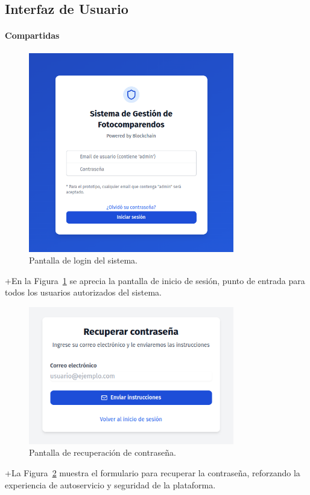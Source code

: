\subsection{Interfaz de Usuario}
\paragraph{Compartidas}
 \begin{figure}[htbp]
    \centering
    \includegraphics[width=0.8\textwidth]{Images/UI1.png}
    \caption{Pantalla de login del sistema.}
    \label{fig:login}
\end{figure}
+En la Figura~\ref{fig:login} se aprecia la pantalla de inicio de sesión, punto de entrada para todos los usuarios autorizados del sistema.

 \begin{figure}[htbp]
    \centering
    \includegraphics[width=0.8\textwidth]{Images/UI2.png}
    \caption{Pantalla de recuperación de contraseña.}
    \label{fig:recuperar_password}
\end{figure}
+La Figura~\ref{fig:recuperar_password} muestra el formulario para recuperar la contraseña, reforzando la experiencia de autoservicio y seguridad de la plataforma.
